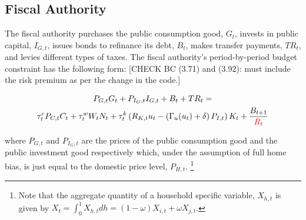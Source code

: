 \documentclass[a4paper,11pt]{article}
\numberwithin{equation}{section}
\begin{document}
	\subsection{Fiscal Authority} \label{fiscal}
	
	The fiscal authority purchases the public consumption good, $G_t$, invests in public capital, $I_{G,t}$, issues bonds to refinance its debt, $B_t$, makes transfer payments, $TR_t$, and levies different types of taxes. The fiscal authority's period-by-period budget constraint has the following form: {\color{red}[CHECK BC (3.71) and (3.92): must include the risk premium as per the change in the code.]}
	
	\begin{multline} \label{fisc_budget}
	P_{G,t}G_t +P_{I_G,t}I_{G,t}+B_t+TR_t = \\\tau_t^cP_{C,t}C_t +\tau_t^wW_tN_t +\tau_t^k\left(R_{K,t}u_t-\left(\Gamma_u(u_t)+\delta\right)P_{I,t}\right)K_t+\frac{B_{t+1}}{{\color{red}R_t}}
	\end{multline}
	
	where $P_{G,t}$ and $P_{I_G,t}$ are the prices of the public consumption good and the public investment good respectively which, under the assumption of full home bias, is just equal to the domestic price level, $P_{H,t}$. \footnote{Note that the aggregate quantity of a household specific variable, $X_{h,t}$ is given by $X_t=\int_{0}^{1}X_{h,t}dh=(1-\omega)X_{i,t}+\omega X_{j,t}$.}
	
%	
\end{document}
